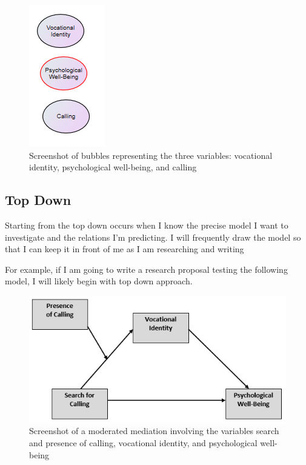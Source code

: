 \documentclass[
  english,
]{book}
\begin{document}
\begin{figure}
\centering
\includegraphics{images/Excel/TopDown.png}
\caption{Screenshot of bubbles representing the three variables: vocational identity, psychological well-being, and calling}
\end{figure}

\hypertarget{top-down}{%
\subsection{Top Down}\label{top-down}}

Starting from the top down occurs when I know the precise model I want to investigate and the relations I'm predicting. I will frequently draw the model so that I can keep it in front of me as I am researching and writing

For example, if I am going to write a research proposal testing the following model, I will likely begin with top down approach.

\begin{figure}
\centering
\includegraphics{images/Excel/TopDown2.png}
\caption{Screenshot of a moderated mediation involving the variables search and presence of calling, vocational identity, and psychological well-being}
\end{figure}
\end{document}
